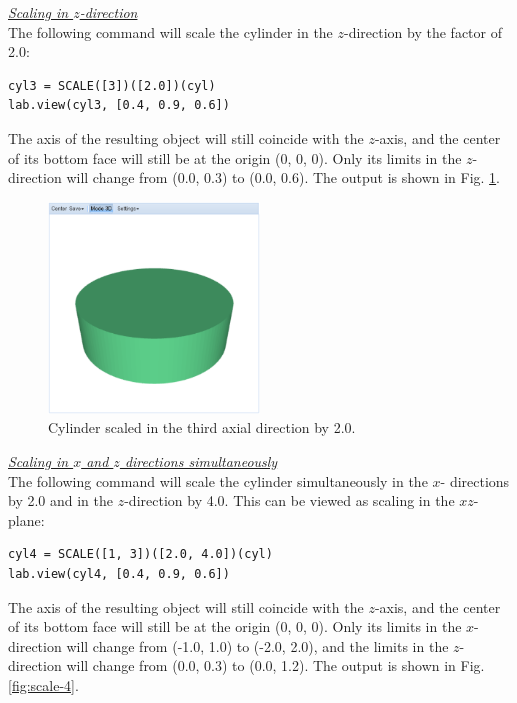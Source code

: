 \documentclass[article,A4,12pt]{llncs}
\begin{document}
\noindent
\underline{\em Scaling in $z$-direction}\\

The following command will 
scale the cylinder in the $z$-direction by the factor of 2.0: 

\begin{verbatim}
cyl3 = SCALE([3])([2.0])(cyl)
lab.view(cyl3, [0.4, 0.9, 0.6])
\end{verbatim}
The axis of the resulting object will still
coincide with the $z$-axis, and the center of its bottom face will
still be at the origin (0, 0, 0). Only its limits in the $z$-direction will change 
from (0.0, 0.3) to (0.0, 0.6). The output is shown in Fig. \ref{fig:scale-3}.

\newpage

\begin{figure}[!ht]
\begin{center}
\includegraphics[width=0.5\textwidth]{img/scale-3.png}
\end{center}
\vspace{-2mm}
\caption{Cylinder scaled in the third axial direction by 2.0.}
\label{fig:scale-3}
\end{figure}

\noindent
\underline{\em Scaling in $x$ and $z$ directions simultaneously}\\

The following command will 
scale the cylinder simultaneously in the $x$- directions by 2.0 and in the $z$-direction by 4.0.
This can be viewed as scaling in the $xz$-plane:

\begin{verbatim}
cyl4 = SCALE([1, 3])([2.0, 4.0])(cyl)
lab.view(cyl4, [0.4, 0.9, 0.6])
\end{verbatim}
The axis of the resulting object will still
coincide with the $z$-axis, and the center of its bottom face will
still be at the origin (0, 0, 0). Only its limits in the $x$-direction 
will change from (-1.0, 1.0) to (-2.0, 2.0), and the limits in the 
$z$-direction will change 
from (0.0, 0.3) to (0.0, 1.2). The output is shown in Fig. \ref{fig:scale-4}.
\end{document}
